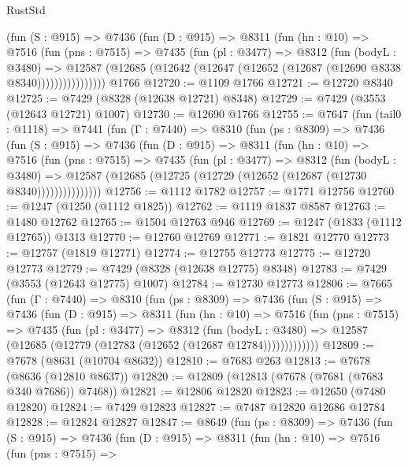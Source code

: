 \begin{lexlean}{RustStd}
\begin{coremodule}
            (fun (S : @915) =>
            @7436
              (fun (D : @915) =>
              @8311
                (fun (hn : @10) =>
                @7516
                  (fun (pns : @7515) =>
                  @7435
                    (fun (pl : @3477) =>
                    @8312
                      (fun (bodyL : @3480) =>
                      @12587
                        (@12685 (@12642 (@12647 (@12652 (@12687 (@12690 @8338 @8340))))))))))))))))
    @1766
@12720 := @1109 @1766
@12721 := @12720 @8340
@12725 := @7429 (@8328 (@12638 @12721) @8348)
@12729 := @7429 (@3553 (@12643 @12721) @1007)
@12730 := @12690 @1766
@12755 := @7647
    (fun (tail0 : @1118) =>
    @7441
      (fun (Γ : @7440) =>
      @8310
        (fun (ps : @8309) =>
        @7436
          (fun (S : @915) =>
          @7436
            (fun (D : @915) =>
            @8311
              (fun (hn : @10) =>
              @7516
                (fun (pns : @7515) =>
                @7435
                  (fun (pl : @3477) =>
                  @8312
                    (fun (bodyL : @3480) =>
                    @12587 (@12685 (@12725 (@12729 (@12652 (@12687 (@12730 @8340)))))))))))))))
@12756 := @1112 @1782
@12757 := @1771 @12756
@12760 := @1247 (@1250 (@1112 @1825))
@12762 := @1119 @1837 @8587
@12763 := @1480 @12762
@12765 := @1504 @12763 @946
@12769 := @1247 (@1833 (@1112 @12765)) @1313
@12770 := @12760 @12769
@12771 := @1821 @12770
@12773 := @12757 (@1819 @12771)
@12774 := @12755 @12773
@12775 := @12720 @12773
@12779 := @7429 (@8328 (@12638 @12775) @8348)
@12783 := @7429 (@3553 (@12643 @12775) @1007)
@12784 := @12730 @12773
@12806 := @7665
    (fun (Γ : @7440) =>
    @8310
      (fun (ps : @8309) =>
      @7436
        (fun (S : @915) =>
        @7436
          (fun (D : @915) =>
          @8311
            (fun (hn : @10) =>
            @7516
              (fun (pns : @7515) =>
              @7435
                (fun (pl : @3477) =>
                @8312
                  (fun (bodyL : @3480) =>
                  @12587 (@12685 (@12779 (@12783 (@12652 (@12687 @12784)))))))))))))
@12809 := @7678 (@8631 (@10704 @8632))
@12810 := @7683 @263
@12813 := @7678 (@8636 (@12810 @8637))
@12820 := @12809 (@12813 (@7678 (@7681 (@7683 @340 @7686)) @7468))
@12821 := @12806 @12820
@12823 := @12650 (@7480 @12820)
@12824 := @7429 @12823
@12827 := @7487 @12820 @12686 @12784
@12828 := @12824 @12827
@12847 := @8649
    (fun (ps : @8309) =>
    @7436
      (fun (S : @915) =>
      @7436
        (fun (D : @915) =>
        @8311
          (fun (hn : @10) =>
          @7516
            (fun (pns : @7515) =>

\end{coremodule}
\end{lexlean}
